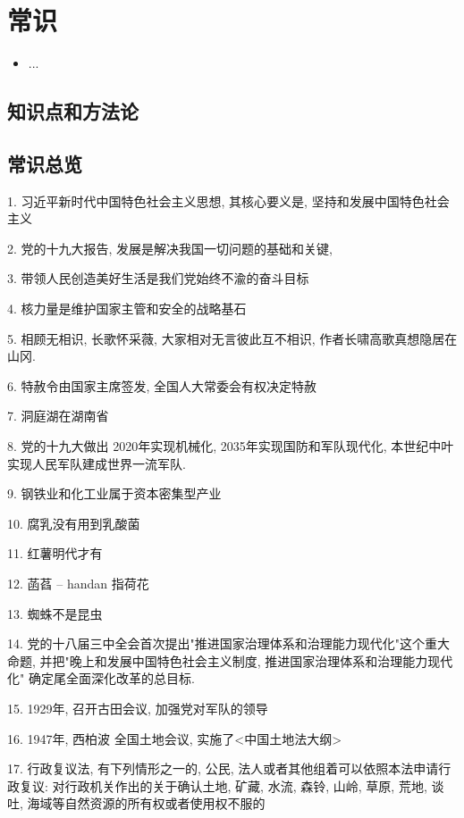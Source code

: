 \chapter{常识}
\label{chap1}
\begin{itemize}[noitemsep,topsep=0pt,parsep=0pt,partopsep=0pt]
	\item ...
\end{itemize}

\section{知识点和方法论}
\section{常识总览}

1. 习近平新时代中国特色社会主义思想, 其核心要义是, 坚持和发展中国特色社会主义

2. 党的十九大报告, 发展是解决我国一切问题的基础和关键,

3. 带领人民创造美好生活是我们党始终不渝的奋斗目标

4. 核力量是维护国家主管和安全的战略基石

5. 相顾无相识, 长歌怀采薇, 大家相对无言彼此互不相识, 作者长啸高歌真想隐居在山冈.

6. 特赦令由国家主席签发, 全国人大常委会有权决定特赦

7. 洞庭湖在湖南省

8. 党的十九大做出 2020年实现机械化, 2035年实现国防和军队现代化, 本世纪中叶实现人民军队建成世界一流军队.

9. 钢铁业和化工业属于资本密集型产业

10. 腐乳没有用到乳酸菌

11. 红薯明代才有

12. 菡萏  -- handan 指荷花

13. 蜘蛛不是昆虫

14. 党的十八届三中全会首次提出"推进国家治理体系和治理能力现代化"这个重大命题, 并把"晚上和发展中国特色社会主义制度, 推进国家治理体系和治理能力现代化" 确定尾全面深化改革的总目标.

15. 1929年, 召开古田会议, 加强党对军队的领导

16. 1947年, 西柏波 全国土地会议,  实施了<中国土地法大纲>

17. 行政复议法, 有下列情形之一的, 公民, 法人或者其他组着可以依照本法申请行政复议: 对行政机关作出的关于确认土地, 矿藏, 水流, 森铃, 山岭, 草原, 荒地, 谈吐, 海域等自然资源的所有权或者使用权不服的

